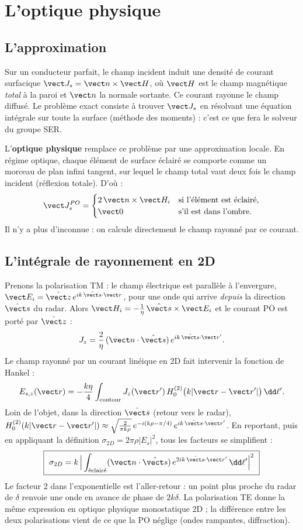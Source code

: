 \chapter{L'optique physique}\label{ch:po}

\section{L'approximation}
Sur un conducteur parfait, le champ incident induit une densité de courant surfacique $\vect J_s=\vect n\times\vect H$, où $\vect H$ est le champ magnétique \emph{total} à la paroi et $\vect n$ la normale sortante. Ce courant rayonne le champ diffusé. Le problème exact consiste à trouver $\vect J_s$ en résolvant une équation intégrale sur toute la surface (méthode des moments) : c'est ce que fera le solveur du groupe SER.

L'\textbf{optique physique} remplace ce problème par une approximation locale. En régime optique, chaque élément de surface éclairé se comporte comme un morceau de plan infini tangent, sur lequel le champ total vaut deux fois le champ incident (réflexion totale). D'où :
\[
\vect J_s^{PO}=\begin{cases}2\,\vect n\times\vect H_i & \text{si l'élément est éclairé},\\ \vect 0 & \text{s'il est dans l'ombre}.\end{cases}
\]
Il n'y a plus d'inconnue : on calcule directement le champ rayonné par ce courant.

\section{L'intégrale de rayonnement en 2D}
Prenons la polarisation TM : le champ électrique est parallèle à l'envergure, $\vect E_i=\hat{\vect z}\,e^{ik\,\shat\cdot\vect r}$, pour une onde qui arrive \emph{depuis} la direction $\shat$ du radar. Alors $\vect H_i=-\frac1\eta\,\shat\times\vect E_i$ et le courant PO est porté par $\hat{\vect z}$ :
\[
J_z=\frac{2}{\eta}\,(\vect n\cdot\shat)\,e^{ik\,\shat\cdot\vect r'} .
\]
Le champ rayonné par un courant linéique en 2D fait intervenir la fonction de Hankel :
\[
E_{s,z}(\vect r)=-\frac{k\eta}{4}\int_{\text{contour}}J_z(\vect r')\,H_0^{(2)}\big(k|\vect r-\vect r'|\big)\,\dd\ell'.
\]
Loin de l'objet, dans la direction $\shat$ (retour vers le radar), $H_0^{(2)}(k|\vect r-\vect r'|)\approx\sqrt{\frac{2}{\pi k\rho}}\,e^{-i(k\rho-\pi/4)}\,e^{ik\,\shat\cdot\vect r'}$. En reportant, puis en appliquant la définition $\sigma_{2D}=2\pi\rho|E_s|^2$, tous les facteurs se simplifient :
\[
\boxed{\ \sigma_{2D}=k\,\Big|\int_{\text{éclairé}}(\vect n\cdot\shat)\,e^{2ik\,\shat\cdot\vect r'}\,\dd\ell'\Big|^2\ }
\]
Le facteur 2 dans l'exponentielle est l'aller-retour : un point plus proche du radar de $\delta$ renvoie une onde en avance de phase de $2k\delta$. La polarisation TE donne la même expression en optique physique monostatique 2D ; la différence entre les deux polarisations vient de ce que la PO néglige (ondes rampantes, diffraction).

